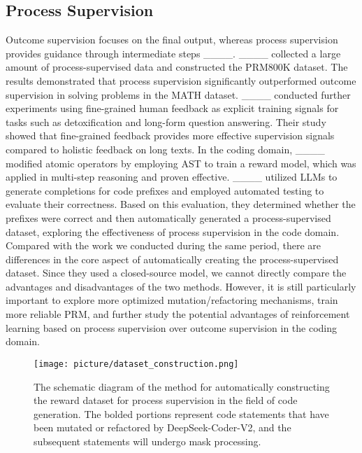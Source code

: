 \subsection{Process Supervision}
Outcome supervision focuses on the final output, whereas process supervision provides guidance through intermediate steps ____. 
 ____ collected a large amount of process-supervised data and constructed the PRM800K dataset. The results demonstrated that process supervision significantly outperformed outcome supervision in solving problems in the MATH dataset. ____ conducted further experiments using fine-grained human feedback as explicit training signals for tasks such as detoxification and long-form question answering. Their study showed that fine-grained feedback provides more effective supervision signals compared to holistic feedback on long texts. In the coding domain, ____ modified atomic operators by employing AST to train a reward model, which was applied in multi-step reasoning and proven effective. ____ utilized LLMs to generate completions for code prefixes and employed automated testing to evaluate their correctness. Based on this evaluation, they determined whether the prefixes were correct and then automatically generated a process-supervised dataset, exploring the effectiveness of process supervision in the code domain. Compared with the work we conducted during the same period, there are differences in the core aspect of automatically creating the process-supervised dataset. Since they used a closed-source model, we cannot directly compare the advantages and disadvantages of the two methods. However, it is still particularly important to explore more optimized mutation/refactoring mechanisms, train more reliable PRM, and further study the potential advantages of reinforcement learning based on process supervision over outcome supervision in the coding domain. 

\begin{figure*}[t]
  \centering
  \texttt{[image: picture/dataset\_construction.png]}
  \caption{The schematic diagram of the method for automatically constructing the reward dataset for process supervision in the field of code generation. The bolded portions represent code statements that have been mutated or refactored by DeepSeek-Coder-V2, and the subsequent statements will undergo mask processing. 
  }
  \label{fig:dataset construction}
\end{figure*}